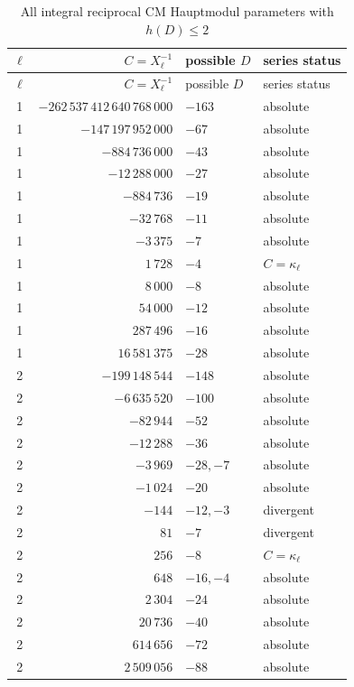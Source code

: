 \documentclass[11pt,a4paper]{amsart} %
\theoremstyle{definition}
\begin{document}
\begin{longtable}{@{}c r l l@{}}
\caption{All integral reciprocal CM Hauptmodul parameters with \(h(D)\le2\)}
\label{tab:CMdenoms}\\
\toprule
\(\ell\)&\(C=X_\ell^{-1}\)&possible \(D\)&series status\\
\midrule
\endfirsthead
\toprule
\(\ell\)&\(C=X_\ell^{-1}\)&possible \(D\)&series status\\
\midrule
\endhead
1 & \(-262\,537\,412\,640\,768\,000\) & \(-163\) & absolute \\
1 & \(-147\,197\,952\,000\) & \(-67\) & absolute \\
1 & \(-884\,736\,000\) & \(-43\) & absolute \\
1 & \(-12\,288\,000\) & \(-27\) & absolute \\
1 & \(-884\,736\) & \(-19\) & absolute \\
1 & \(-32\,768\) & \(-11\) & absolute \\
1 & \(-3\,375\) & \(-7\) & absolute \\
1 & \(1\,728\) & \(-4\) & \(C=\kappa_\ell\) \\
1 & \(8\,000\) & \(-8\) & absolute \\
1 & \(54\,000\) & \(-12\) & absolute \\
1 & \(287\,496\) & \(-16\) & absolute \\
1 & \(16\,581\,375\) & \(-28\) & absolute \\
2 & \(-199\,148\,544\) & \(-148\) & absolute \\
2 & \(-6\,635\,520\) & \(-100\) & absolute \\
2 & \(-82\,944\) & \(-52\) & absolute \\
2 & \(-12\,288\) & \(-36\) & absolute \\
2 & \(-3\,969\) & \(-28, -7\) & absolute \\
2 & \(-1\,024\) & \(-20\) & absolute \\
2 & \(-144\) & \(-12, -3\) & divergent \\
2 & \(81\) & \(-7\) & divergent \\
2 & \(256\) & \(-8\) & \(C=\kappa_\ell\) \\
2 & \(648\) & \(-16, -4\) & absolute \\
2 & \(2\,304\) & \(-24\) & absolute \\
2 & \(20\,736\) & \(-40\) & absolute \\
2 & \(614\,656\) & \(-72\) & absolute \\
2 & \(2\,509\,056\) & \(-88\) & absolute \\

\end{longtable}
\end{document}

